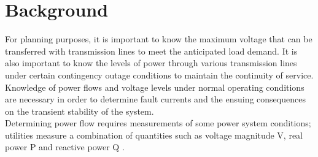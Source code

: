 \chapter{Background}

For planning purposes, it is important to know the maximum voltage that can be
transferred with transmission lines to meet the anticipated load demand. It is also important to know the levels of power through various transmission lines under certain contingency outage conditions to maintain the continuity of service. Knowledge of power flows and voltage levels under normal operating conditions are necessary in order to determine fault currents and the ensuing consequences on the transient stability of the system. \\
Determining power flow requires measurements of some power system conditions; utilities measure a combination of quantities such as voltage magnitude \gls{V}, real power \gls{P} and reactive power \gls{Q} \cite{eps}.

